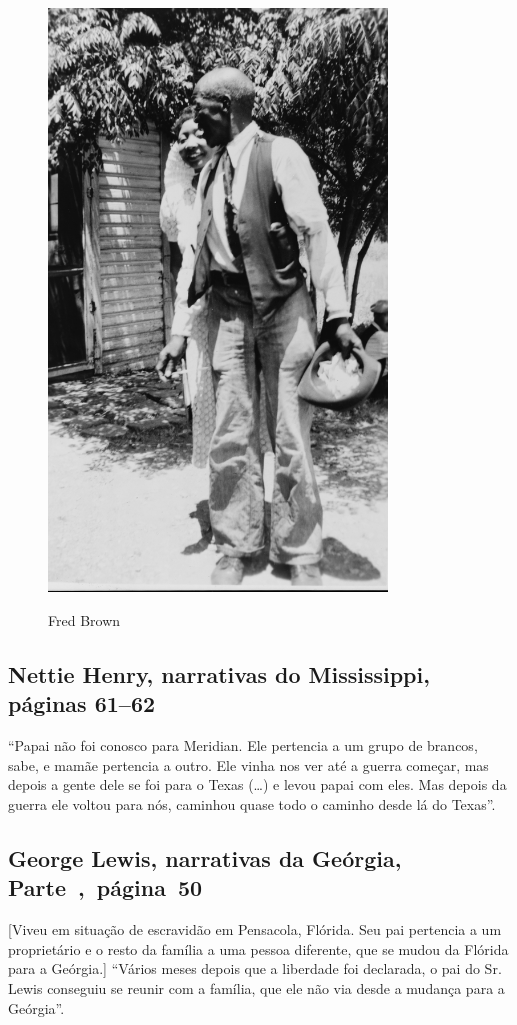\begin{figure}[]
\centering
 \includegraphics[width=90mm]{./imgs/fredbrown_recorte.jpg} \label{img12}
\caption{Fred Brown}
\end{figure}

\subsection{Nettie Henry, narrativas do Mississippi, páginas 61--62}
\label{ref142}

``Papai não foi conosco para Meridian. Ele pertencia a um grupo de
brancos, sabe, e mamãe pertencia a outro. Ele vinha nos ver até a guerra
começar, mas depois a gente dele se foi para o Texas (\ldots{}) e levou
papai com eles. Mas depois da guerra ele voltou para nós, caminhou quase
todo o caminho desde lá do Texas''.

\subsection{George Lewis, narrativas da Geórgia, Parte~,~página~50}
\label{ref173}

{[}Viveu em situação de escravidão em Pensacola, Flórida. Seu pai pertencia a um proprietário e o resto da família a uma pessoa diferente, que se mudou da Flórida para a Geórgia.{]} ``Vários meses
depois que a liberdade foi declarada, o pai do Sr. Lewis conseguiu se
reunir com a família, que ele não via desde a mudança para a Geórgia''.

